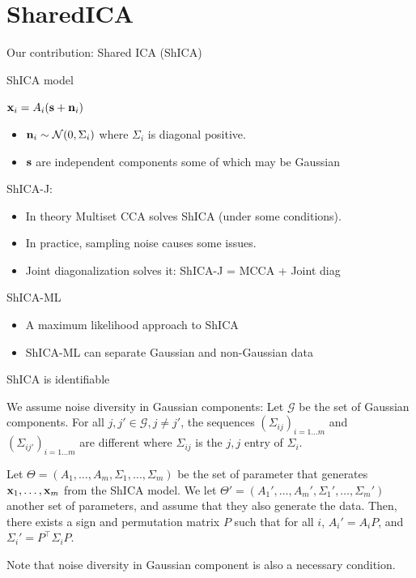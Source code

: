 \documentclass[bigger]{beamer}
\begin{document}
\section{SharedICA}
\begin{frame}{Our contribution: Shared ICA (ShICA)}
  \begin{block}{ShICA model}
     \begin{center}$ \mathbf{x}_i = A_i (\mathbf{s} + \mathbf{n}_i)$ \end{center}
    \begin{itemize}
      \item $\mathbf{n}_i \sim \mathcal{N}(0, \Sigma_i)$ where $\Sigma_i$ is diagonal positive.
      \item $\mathbf{s}$ are independent components some of which may be Gaussian
     \end{itemize}
  \end{block}
  \begin{block}{ShICA-J: }
    \begin{itemize}
\item In theory Multiset CCA solves ShICA (under some conditions).
\item In practice, sampling noise causes some issues.
\item Joint diagonalization solves it: ShICA-J = MCCA + Joint diag
  \end{itemize}
  \end{block}
  \begin{block}{ShICA-ML}

    \begin{itemize}
  \item A maximum likelihood approach to ShICA
  \item ShICA-ML can separate Gaussian and non-Gaussian data
    \end{itemize}
  \end{block}
\end{frame}

\begin{frame}{ShICA is identifiable}
\begin{theorem}[Identifiability]
  We assume noise diversity in Gaussian components:
  Let $\mathcal{G}$ be the set of Gaussian components. For all $j, j'  \in \mathcal{G}, j \neq j'$, the sequences $(\Sigma_{ij})_{i=1 \dots m}$ and $(\Sigma_{ij'})_{i=1 \dots m}$ are different where $\Sigma_{ij}$ is the $j, j$ entry of $\Sigma_i$.

  Let $\Theta=(A_1, \dots, A_m, \Sigma_1, \dots,\Sigma_m)$ be the set of
  parameter that generates $\mathbf{x}_1 ,\dots, \mathbf{x}_m$ from the ShICA model. 
  We let $\Theta'=(A_1', \dots, A_m', \Sigma_1', \dots,\Sigma_m')$ another set
  of parameters, and assume that they also generate the data. Then, there exists a sign and permutation matrix $P$ such that for all $i$, $A_i'=A_iP$, and $\Sigma_i'= P^{\top} \Sigma_i P$.
\end{theorem}
Note that noise diversity in Gaussian component is also a necessary condition.
\end{frame}
\end{document}
